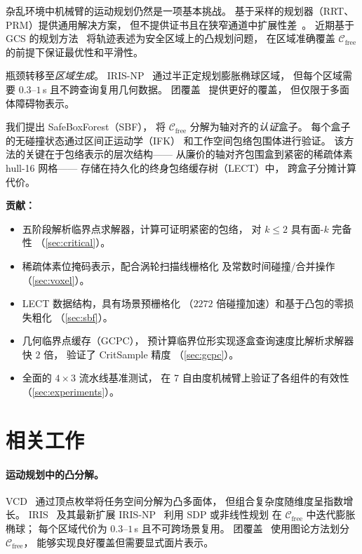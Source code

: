 \documentclass[journal]{IEEEtran}
\newcommand{\Cfree}{\mathcal{C}_\text{free}}
\begin{document}
杂乱环境中机械臂的运动规划仍然是一项基本挑战。
基于采样的规划器（RRT、PRM）提供通用解决方案，
但不提供证书且在狭窄通道中扩展性差~\cite{lavalle2006planning}。
近期基于 GCS 的规划方法~\cite{marcucci2024motion}
将轨迹表述为安全区域上的凸规划问题，
在区域准确覆盖 $\Cfree$ 的前提下保证最优性和平滑性。

瓶颈转移至\emph{区域生成}。
IRIS-NP~\cite{werner2024fast} 通过半正定规划膨胀椭球区域，
但每个区域需要 $0.3$--$1$\,s 且不跨查询复用几何数据。
团覆盖~\cite{amice2024clique} 提供更好的覆盖，
但仅限于多面体障碍物表示。

我们提出 SafeBoxForest（SBF），
将 $\Cfree$ 分解为轴对齐的\emph{认证}盒子。
每个盒子的无碰撞状态通过区间正运动学（IFK）
和工作空间包络包围体进行验证。
该方法的关键在于包络表示的层次结构——
从廉价的轴对齐包围盒到紧密的稀疏体素 hull-16 网格——
存储在持久化的终身包络缓存树（LECT）中，
跨盒子分摊计算代价。

\textbf{贡献：}
\begin{itemize}
  \item 五阶段解析临界点求解器，计算可证明紧密的包络，
    对 $k \leq 2$ 具有面-$k$ 完备性
    （\cref{sec:critical}）。
  \item 稀疏体素位掩码表示，配合涡轮扫描线栅格化
    及常数时间碰撞/合并操作
    （\cref{sec:voxel}）。
  \item LECT 数据结构，具有场景预栅格化
    （$2272$ 倍碰撞加速）和基于凸包的零损失粗化
    （\cref{sec:sbf}）。
  \item 几何临界点缓存（GCPC），
    预计算临界位形实现逐盒查询速度比解析求解器快 $2$ 倍，
    验证了 CritSample 精度
    （\cref{sec:gcpc}）。
  \item 全面的 $4{\times}3$ 流水线基准测试，
    在 7 自由度机械臂上验证了各组件的有效性
    （\cref{sec:experiments}）。
\end{itemize}

\section{相关工作}\label{sec:related}

\paragraph{运动规划中的凸分解。}
VCD~\cite{werner2024vcd} 通过顶点枚举将任务空间分解为凸多面体，
但组合复杂度随维度呈指数增长。
IRIS~\cite{deits2015computing} 及其最新扩展
IRIS-NP~\cite{werner2024fast} 利用 SDP 或非线性规划
在 $\Cfree$ 中迭代膨胀椭球；
每个区域代价为 $0.3$--$1$\,s 且不可跨场景复用。
团覆盖~\cite{amice2024clique} 使用图论方法划分 $\Cfree$，
能够实现良好覆盖但需要显式面片表示。
\end{document}
